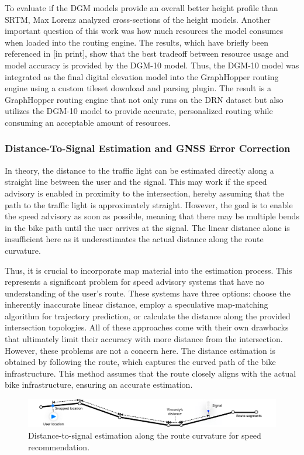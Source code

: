 To evaluate if the DGM models provide an overall better height profile than SRTM, Max Lorenz analyzed cross-sections of the height models. Another important question of this work was how much resources the model consumes when loaded into the routing engine. The results, which have briefly been referenced in [in print], show that the best tradeoff between resource usage and model accuracy is provided by the DGM-10 model. Thus, the DGM-10 model was integrated as the final digital elevation model into the GraphHopper routing engine using a custom tileset download and parsing plugin. The result is a GraphHopper routing engine that not only runs on the DRN dataset but also utilizes the DGM-10 model to provide accurate, personalized routing while consuming an acceptable amount of resources. 

\subsubsection{Distance-To-Signal Estimation and GNSS Error Correction}

In theory, the distance to the traffic light can be estimated directly along a straight line between the user and the signal. This may work if the speed advisory is enabled in proximity to the intersection, hereby assuming that the path to the traffic light is approximately straight. However, the goal is to enable the speed advisory as soon as possible, meaning that there may be multiple bends in the bike path until the user arrives at the signal. The linear distance alone is insufficient here as it underestimates the actual distance along the route curvature. 

Thus, it is crucial to incorporate map material into the estimation process. This represents a significant problem for speed advisory systems that have no understanding of the user's route. These systems have three options: choose the inherently inaccurate linear distance, employ a speculative map-matching algorithm for trajectory prediction, or calculate the distance along the provided intersection topologies. All of these approaches come with their own drawbacks that ultimately limit their accuracy with more distance from the intersection. However, these problems are not a concern here. The distance estimation is obtained by following the route, which captures the curved path of the bike infrastructure. This method assumes that the route closely aligns with the actual bike infrastructure, ensuring an accurate estimation.

\begin{figure}[htbp]
\centering
\includegraphics[width=\linewidth]{images/distance-to-signal-estimation.pdf}
\caption{Distance-to-signal estimation along the route curvature for speed recommendation.}
\label{fig:distance-to-signal-estimation}
\end{figure}

